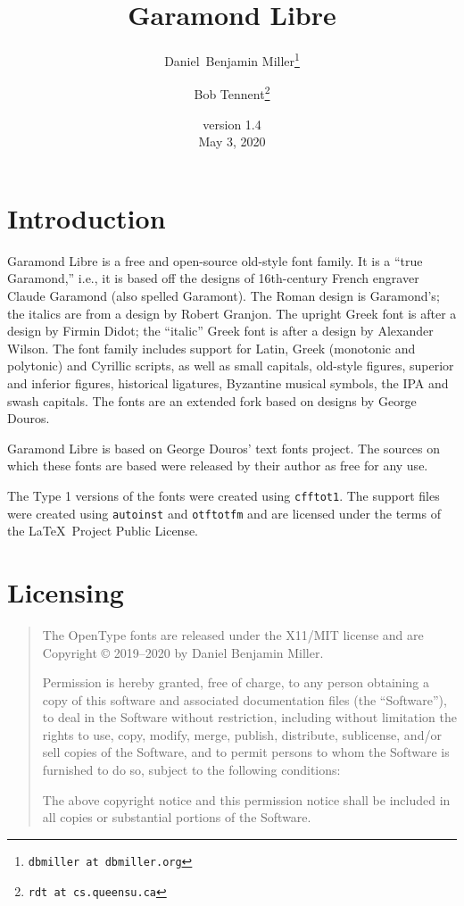 \documentclass[12pt]{article}
\title{Garamond Libre}
\date{version 1.4\\[2ex] May 3, 2020}
\author{Daniel~Benjamin Miller\thanks{\texttt{dbmiller at dbmiller.org}} \and Bob Tennent\thanks{\texttt{rdt at cs.queensu.ca}}}
\begin{document}
\maketitle

\section*{Introduction}

Garamond Libre is a free and open-source old-style font
family. It is a ``true Garamond,'' i.e., it is based off the
designs of 16th-century French engraver Claude Garamond
(also spelled Garamont). The Roman design is Garamond’s;
the italics are from a design by Robert Granjon. The upright
Greek font is after a design by Firmin Didot; the ``italic''
Greek font is after a design by Alexander Wilson. The font
family includes support for Latin, Greek (monotonic and
polytonic) and Cyrillic scripts, as well as small capitals,
old-style figures, superior and inferior figures, historical
ligatures, Byzantine musical symbols, the IPA and swash
capitals. The fonts are an extended fork based on designs by
George Douros. 



Garamond Libre is based on George Douros' text fonts
project. The sources on which these fonts are based were
released by their author as free for any use.

The Type 1 versions of the fonts were created using \texttt{cfftot1}.
The support files were created using \texttt{autoinst} and \texttt{otftotfm}
and are licensed under the terms of the \LaTeX\ Project Public
License.
\section*{Licensing}
\begin{quote}
The OpenType fonts are released under the \textsc{X11}/\textsc{MIT} license
and are Copyright © 2019--2020 by Daniel Benjamin Miller.

Permission is hereby granted, free of charge, to any
person obtaining a copy of this software and associated
documentation files (the ``Software''), to deal in the
Software without restriction, including without limitation
the rights to use, copy, modify, merge, publish, distribute,
sublicense, and/or sell copies of the Software, and to
permit persons to whom the Software is furnished to do so,
subject to the following conditions:

The above copyright notice and this permission notice shall
be included in all copies or substantial portions of the
Software.
\end{quote}
\end{document}
